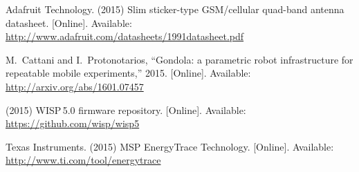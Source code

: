 \documentclass[conference,letterpaper,twoside,final,10pt]{IEEEtran}
\begin{document}
\begin{thebibliography}{10}
\BIBentryALTinterwordspacing
{Adafruit Technology}. (2015) Slim sticker-type {GSM}/cellular quad-band
  antenna datasheet. [Online]. Available:
  \url{http://www.adafruit.com/datasheets/1991datasheet.pdf}
\BIBentrySTDinterwordspacing

\vfill\break

\BIBentryALTinterwordspacing
M.~{Cattani} and I.~{Protonotarios}, ``Gondola: a parametric robot
  infrastructure for repeatable mobile experiments,'' 2015. [Online].
  Available: \url{http://arxiv.org/abs/1601.07457}
\BIBentrySTDinterwordspacing

\BIBentryALTinterwordspacing
(2015) {WISP}\,5.0 firmware repository. [Online]. Available:
  \url{https://github.com/wisp/wisp5}
\BIBentrySTDinterwordspacing

\BIBentryALTinterwordspacing
{Texas Instruments}. (2015) {MSP} {EnergyTrace} {Technology}. [Online].
  Available: \url{http://www.ti.com/tool/energytrace}
\BIBentrySTDinterwordspacing

\end{thebibliography}
\end{document}
